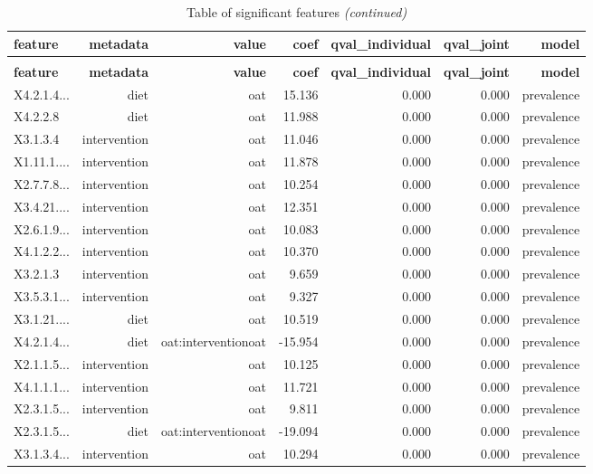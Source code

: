 \documentclass[
]{article}
\begin{document}
\begin{longtable}[t]{lrrrrrr}
\caption{Table of significant features}\\
\toprule
\textbf{feature} & \textbf{metadata} & \textbf{value} & \textbf{coef} & \textbf{qval\_individual} & \textbf{qval\_joint} & \textbf{model}\\
\midrule
\endfirsthead
\caption[]{Table of significant features \textit{(continued)}}\\
\toprule
\textbf{feature} & \textbf{metadata} & \textbf{value} & \textbf{coef} & \textbf{qval\_individual} & \textbf{qval\_joint} & \textbf{model}\\
\midrule
\endhead

\endfoot
\bottomrule
\endlastfoot
X4.2.1.4... & diet & oat & 15.136 & 0.000 & 0.000 & prevalence\\
X4.2.2.8 & diet & oat & 11.988 & 0.000 & 0.000 & prevalence\\
X3.1.3.4 & intervention & oat & 11.046 & 0.000 & 0.000 & prevalence\\
X1.11.1.... & intervention & oat & 11.878 & 0.000 & 0.000 & prevalence\\
X2.7.7.8... & intervention & oat & 10.254 & 0.000 & 0.000 & prevalence\\
\addlinespace
X3.4.21.... & intervention & oat & 12.351 & 0.000 & 0.000 & prevalence\\
X2.6.1.9... & intervention & oat & 10.083 & 0.000 & 0.000 & prevalence\\
X4.1.2.2... & intervention & oat & 10.370 & 0.000 & 0.000 & prevalence\\
X3.2.1.3 & intervention & oat & 9.659 & 0.000 & 0.000 & prevalence\\
X3.5.3.1... & intervention & oat & 9.327 & 0.000 & 0.000 & prevalence\\
\addlinespace
X3.1.21.... & diet & oat & 10.519 & 0.000 & 0.000 & prevalence\\
X4.2.1.4... & diet & oat:interventionoat & -15.954 & 0.000 & 0.000 & prevalence\\
X2.1.1.5... & intervention & oat & 10.125 & 0.000 & 0.000 & prevalence\\
X4.1.1.1... & intervention & oat & 11.721 & 0.000 & 0.000 & prevalence\\
X2.3.1.5... & intervention & oat & 9.811 & 0.000 & 0.000 & prevalence\\
\addlinespace
X2.3.1.5... & diet & oat:interventionoat & -19.094 & 0.000 & 0.000 & prevalence\\
X3.1.3.4... & intervention & oat & 10.294 & 0.000 & 0.000 & prevalence\\

\end{longtable}
\end{document}
